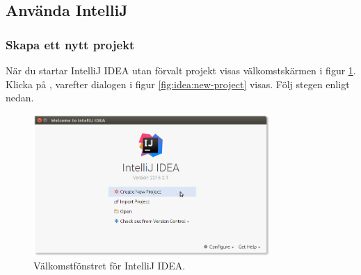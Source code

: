 \subsection{Använda IntelliJ}\label{appendix:ide:intellij:use}

\subsubsection{Skapa ett nytt projekt}

När du startar IntelliJ IDEA utan förvalt projekt visas välkomstskärmen i figur \ref{fig:idea:welcome}. Klicka på , varefter dialogen i figur \ref{fig:idea:new-project} visas. Följ stegen enligt nedan.

\begin{figure}[H]
\centering
\includegraphics[width=0.8\textwidth]{../img/intellij/idea-welcome.png} 
\caption{Välkomstfönstret för IntelliJ IDEA.}
\label{fig:idea:welcome}
\end{figure}

